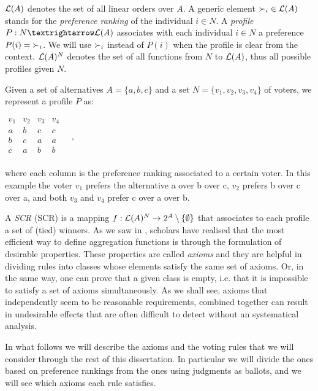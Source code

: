$\mathcal{L}(A)$ denotes the set of all linear orders over $A$. A generic element $\mathbin{\prefi} \in \linors$ stands for the \textit{preference ranking} of the individual $i\in N$.
A \emph{profile} $\prof: N → \linors$ associates with each individual $i \in N$ a preference $\prof(i) =\mathbin{\prefi}$. We will use $\mathbin{\prefi}$ instead of $P(i)$ when the profile is clear from the context. $\mathcal{L}(A)^{N}$ denotes the set of all functions from $N$ to $\mathcal{L}(A)$, thus all possible profiles given $N$. 
\begin{example}
	\label{ex:namedprofile}
	Given a set of alternatives $A=\{a,b,c\}$ and a set $N=\{v_1,v_2,v_3,v_4\}$ of voters, we represent a profile $P$ as:
	\begin{center}
		$
		\begin{array}{cccc}
			v_1 & v_2 & v_3 & v_4\\
			a &	b & c & c \\
			b &	c & a & a \\
			c &	a & b & b \\
		\end{array} \quad, 
		$
	\end{center}
	where each column is the preference ranking associated to a certain voter. In this example the voter $v_1$ prefers the alternative a over b over c, $v_2$ prefers b over c over a, and both $v_3$ and $v_4$ prefer c over a over b.
\end{example}

A \emph{\acl{SCR}} (\acs{SCR}) is a mapping $f:\mathcal{L}(A)^{N}\rightarrow 2^{A} \setminus \{\emptyset \}$ that associates to each profile a set of (tied) winners. 
As we saw in , scholars have realised that the most efficient way to define aggregation functions is through the formulation of desirable properties.
These properties are called \textit{axioms} and they are helpful in dividing rules into classes whose elements satisfy the same set of axioms.
Or, in the same way, one can prove that a given class is empty, i.e. that it is impossible to satisfy a set of axioms simultaneously.
As we shall see, axioms that independently seem to be reasonable requirements, combined together can result 
in undesirable effects that are often difficult to detect without an systematical analysis.

In what follows we will describe the axioms and the voting rules that we will consider through the rest of this dissertation. In particular we will divide the ones based on preference rankings from the ones using judgments as ballots, and we will see which axioms each rule satisfies.

